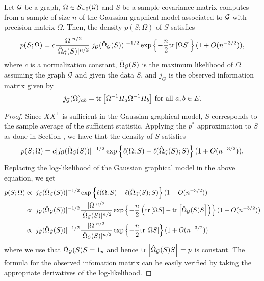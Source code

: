 \begin{lemma} \label{lem-pstar-covariance}
    Let ${\mathcal{G}}$ be a graph, $\Omega \in {\mathcal{S}}_{\succ 0}({\mathcal{G}})$ and $S$ be a sample covariance matrix computes from a sample of size $n$ of the Gaussian graphical model associated to ${\mathcal{G}}$ with precision matrix $\Omega$. Then, the density $p(S; \Omega)$ of $S$ satisfies
    \begin{equation*}
        p(S; \Omega) = c \frac{|\Omega|^{n/2}}{|\hat\Omega_{\mathcal{G}}(S)|^{n/2}} |j_{\mathcal{G}}(\hat\Omega_{\mathcal{G}}(S)) |^{-1/2} \exp\left\{-\frac{n}{2} {\textrm{tr}\left[\Omega S\right]}\right\} (1 + O(n^{-3/2})),
    \end{equation*}
    where $c$ is a normalization constant, $\hat\Omega_{\mathcal{G}}(S)$ is the maximum likelihood of $\Omega$ assuming the graph ${\mathcal{G}}$ and given the data $S$, and $j_G$ is the observed information matrix given by
    \begin{equation} \label{eq-obs-info}
        j_{\mathcal{G}}(\Omega)_{a b} = {\textrm{tr}\left[\Omega^{-1} H_a \Omega^{-1} H_b\right]} {\textrm{ for all }} a, b  \in E.
    \end{equation}
\end{lemma}

\begin{proof}
    Since $XX^\top$ is sufficient in the Gaussian graphical model, $S$ corresponds to the sample average of the sufficient statistic. Applying the $p^*$ approximation to $S$ as done in Section , we have that the density of $S$ satisfies
    \begin{equation*}
        p(S; \Omega) = c |j_{\mathcal{G}}(\hat\Omega_{\mathcal{G}}(S))|^{-1/2} \exp\left\{\ell(\Omega; S) - \ell(\hat\Omega_{\mathcal{G}}(S); S)\right\} (1 + O(n^{-3/2})).
    \end{equation*}
    Replacing the log-likelihood of the Gaussian graphical model in the above equation, we get
    \begin{align*}
        p(S; \Omega) 
        &\propto |j_{\mathcal{G}}(\hat\Omega_{\mathcal{G}}(S))|^{-1/2} \exp\left\{\ell(\Omega; S) - \ell(\hat\Omega_{\mathcal{G}}(S); S)\right\} (1 + O(n^{-3/2})) \\
        &\propto |j_{\mathcal{G}}(\hat\Omega_{\mathcal{G}}(S))|^{-1/2} 
        \frac{|\Omega|^{n/2}}{|\hat\Omega_{\mathcal{G}}(S)|^{n/2}}
        \exp\left\{-\frac{n}{2}\left({\textrm{tr}\left[\Omega S\right]} - {\textrm{tr}\left[\hat\Omega_{\mathcal{G}}(S) S\right]}\right)\right\} (1 + O(n^{-3/2}))\\
        &\propto |j_{\mathcal{G}}(\hat\Omega_{\mathcal{G}}(S))|^{-1/2} 
        \frac{|\Omega|^{n/2}}{|\hat\Omega_{\mathcal{G}}(S)|^{n/2}}
        \exp\left\{-\frac{n}{2}{\textrm{tr}\left[\Omega S\right]}\right\} (1 + O(n^{-3/2}))
    \end{align*}
    where we use that $\hat\Omega_{\mathcal{G}}(S) S = 1_p$ and hence ${\textrm{tr}\left[\hat\Omega_{\mathcal{G}}(S) S\right]} = p$ is constant. The formula for the observed infomation matrix can be easily verified by taking the appropriate derivatives of the log-likelihood.
\end{proof}

